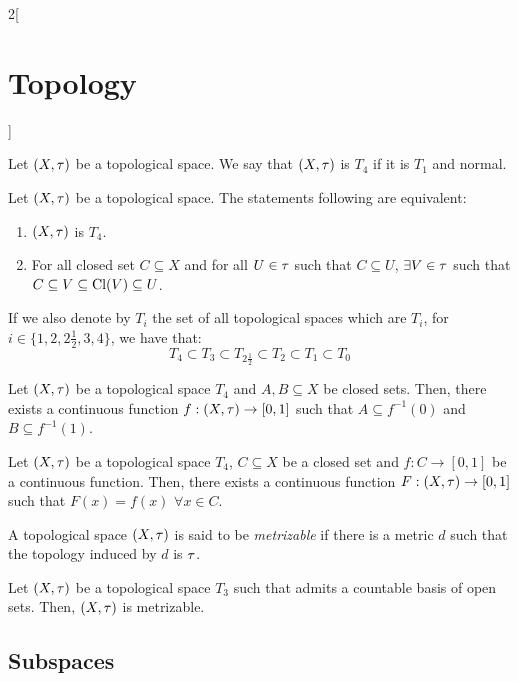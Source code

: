 \documentclass[../../../main.tex]{subfiles}
\begin{document}
\begin{multicols}{2}[\section{Topology}]
    \begin{definition}[$T_4$ space]
        Let $(X,\tau)$ be a topological space. We say that $(X,\tau)$ is $T_4$ if it is $T_1$ and normal.
    \end{definition}
    \begin{theorem}
        Let $(X,\tau)$ be a topological space. The statements following are equivalent:
        \begin{enumerate}
            \item $(X,\tau)$ is $T_4$.
            \item For all closed set $C\subseteq X$ and for all $U\in\tau$ such that $C\subseteq U$, $\exists V\in\tau$ such that $C\subseteq V\subseteq\operatorname{Cl}(V)\subseteq U$.
        \end{enumerate}
    \end{theorem}
    \begin{theorem}
        If we also denote by $T_i$ the set of all topological spaces which are $T_i$, for $i\in\{1,2,2\frac{1}{2},3,4\}$, we have that: $$T_4\subset T_3\subset T_{2\frac{1}{2}}\subset T_2\subset T_1\subset T_0$$
    \end{theorem}
    \begin{lemma}
        Let $(X,\tau)$ be a topological space $T_4$ and $A,B\subseteq X$ be closed sets. Then, there exists a continuous function $f:(X,\tau)\rightarrow[0,1]$ such that $A\subseteq f^{-1}(0)$ and $B\subseteq f^{-1}(1)$.
    \end{lemma}
    \begin{theorem}
        Let $(X,\tau)$ be a topological space $T_4$, $C\subseteq X$ be a closed set and $f:C\rightarrow[0,1]$ be a continuous function. Then, there exists a continuous function $F:(X,\tau)\rightarrow[0,1]$ such that $F(x)=f(x)$ $\forall x\in C$.
    \end{theorem}
    \begin{definition}
        A topological space $(X,\tau)$ is said to be \emph{metrizable} if there is a metric $d$ such that the topology induced by $d$ is $\tau$.
    \end{definition}
    \begin{theorem}
        Let $(X,\tau)$ be a topological space $T_3$ such that admits a countable basis of open sets. Then, $(X,\tau)$ is metrizable.
    \end{theorem}
    \subsection{Subspaces}

\end{multicols}
\end{document}
